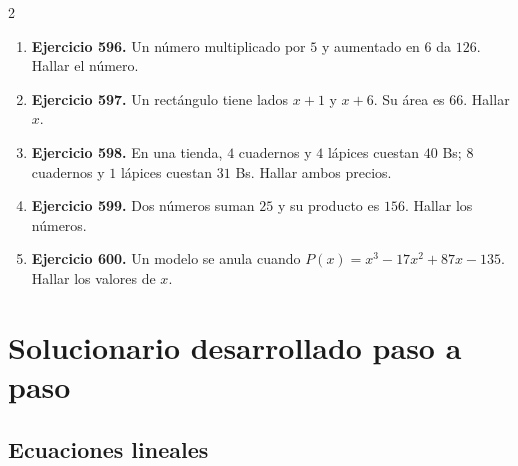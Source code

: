 \documentclass[10pt,a4paper]{article}
\begin{document}
\begin{multicols}{2}
\begin{enumerate}[label=\textbf{\arabic*.}]
\item \textbf{Ejercicio 596.} Un número multiplicado por \(5\) y aumentado en \(6\) da \(126\). Hallar el número.
\item \textbf{Ejercicio 597.} Un rectángulo tiene lados \(x+1\) y \(x+6\). Su área es \(66\). Hallar \(x\).
\item \textbf{Ejercicio 598.} En una tienda, \(4\) cuadernos y \(4\) lápices cuestan \(40\) Bs; \(8\) cuadernos y \(1\) lápices cuestan \(31\) Bs. Hallar ambos precios.
\item \textbf{Ejercicio 599.} Dos números suman \(25\) y su producto es \(156\). Hallar los números.
\item \textbf{Ejercicio 600.} Un modelo se anula cuando \(P(x)=x^{3} - 17 x^{2} + 87 x - 135\). Hallar los valores de \(x\).
\end{enumerate}
\end{multicols}
\newpage
\section{Solucionario desarrollado paso a paso}
\normalsize
\subsection{Ecuaciones lineales}
\end{document}
